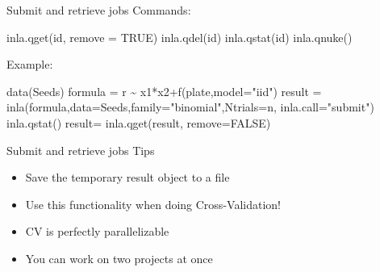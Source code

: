 \documentclass[
  ignorenonframetext,
  handout]{beamer}
\newenvironment{Shaded}{\begin{snugshade}}{\end{snugshade}}
\newcommand{\AttributeTok}[1]{\textcolor[rgb]{0.77,0.63,0.00}{#1}}
\newcommand{\ConstantTok}[1]{\textcolor[rgb]{0.00,0.00,0.00}{#1}}
\newcommand{\FunctionTok}[1]{\textcolor[rgb]{0.00,0.00,0.00}{#1}}
\newcommand{\NormalTok}[1]{#1}
\newcommand{\OtherTok}[1]{\textcolor[rgb]{0.56,0.35,0.01}{#1}}
\newcommand{\SpecialCharTok}[1]{\textcolor[rgb]{0.00,0.00,0.00}{#1}}
\newcommand{\StringTok}[1]{\textcolor[rgb]{0.31,0.60,0.02}{#1}}
\begin{document}
\begin{frame}[fragile]{Submit and retrieve jobs}
\protect\hypertarget{submit-and-retrieve-jobs}{}
Commands: \small

\begin{Shaded}
\begin{Highlighting}[]
  \FunctionTok{inla.qget}\NormalTok{(id, }\AttributeTok{remove =} \ConstantTok{TRUE}\NormalTok{)}
  \FunctionTok{inla.qdel}\NormalTok{(id)}
  \FunctionTok{inla.qstat}\NormalTok{(id)}
  \FunctionTok{inla.qnuke}\NormalTok{()}
\end{Highlighting}
\end{Shaded}

\normalsize

Example: \small

\begin{Shaded}
\begin{Highlighting}[]
\FunctionTok{data}\NormalTok{(Seeds)}
\NormalTok{formula }\OtherTok{=}\NormalTok{ r }\SpecialCharTok{\textasciitilde{}}\NormalTok{ x1}\SpecialCharTok{*}\NormalTok{x2}\SpecialCharTok{+}\FunctionTok{f}\NormalTok{(plate,}\AttributeTok{model=}\StringTok{"iid"}\NormalTok{)}
\NormalTok{result }\OtherTok{=} \FunctionTok{inla}\NormalTok{(formula,}\AttributeTok{data=}\NormalTok{Seeds,}\AttributeTok{family=}\StringTok{"binomial"}\NormalTok{,}\AttributeTok{Ntrials=}\NormalTok{n, }\AttributeTok{inla.call=}\StringTok{"submit"}\NormalTok{)}
\FunctionTok{inla.qstat}\NormalTok{()}
\NormalTok{result}\OtherTok{=} \FunctionTok{inla.qget}\NormalTok{(result, }\AttributeTok{remove=}\ConstantTok{FALSE}\NormalTok{)}
\end{Highlighting}
\end{Shaded}

\normalsize
\end{frame}

\begin{frame}{Submit and retrieve jobs}
\protect\hypertarget{submit-and-retrieve-jobs-1}{}
Tips

\begin{itemize}
\item
  Save the temporary result object to a file
\item
  Use this functionality when doing Cross-Validation!
\item
  CV is perfectly parallelizable
\item
  You can work on two projects at once
\end{itemize}
\end{frame}
\end{document}
